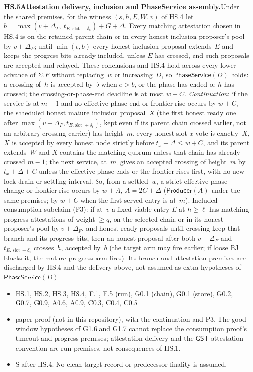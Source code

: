 \documentclass{article}
\newcommand{\slot}{\operatorname{slot}}
\newcommand{\dagnode}[6]{%
\par\medskip\noindent\textbf{#1\enspace #2.}\enspace #3
\begin{itemize}[leftmargin=2.2em,itemsep=0pt,topsep=2pt]
\item[\emph{Uses}] #4
\item[\emph{Evid.}] #5
\item[\emph{Task}] #6
\end{itemize}}
\begin{document}
\dagnode{HS.5}{Attestation delivery, inclusion and PhaseService assembly}{Under the shared
premises, for the witness $(s,h,E,W,v)$ of HS.4 let
$b=\max(v+\Delta_F,\ t_{E.\slot+\delta_{\mathrm t}})+G+\Delta$.  Every matching
attestation chosen in HS.4 is on the retained parent chain or in every honest
inclusion proposer's pool by $v+\Delta_F$; until $\min(e,b)$ every honest
inclusion proposal extends~$E$ and keeps the progress bits already included,
unless $E$ has crossed, and such proposals are accepted and relayed.  These
conclusions and HS.4 hold across every lower advance of $\Sigma.F$ without
replacing~$w$ or increasing~$D$, so $\mathsf{PhaseService}(D)$
holds: a crossing of~$h$ is accepted by~$b$ when $e>b$, or the phase has
ended or $h$ has crossed; the crossing-or-phase-end deadline is at most
$w+C$.  \emph{Continuation}: if the service is at $m-1$ and no
effective phase end or frontier rise occurs by $w+C$, the scheduled honest
mature inclusion proposal~$X$ (the first honest ready one after
$\max(v+\Delta_F,t_{E.\slot+\delta_{\mathrm t}})$, kept even if its parent chain
crossed earlier, not an arbitrary crossing carrier) has height~$m$, every
honest slot-$x$ vote is exactly~$X$, $X$ is accepted by every honest node
strictly before $t_x+\Delta\leq w+C$, and its parent extends~$W$ and $X$
contains the matching quorum unless that chain has already crossed $m-1$; the
next service, at~$m$, gives an accepted crossing of height~$m$ by
$t_x+\Delta+C$ unless the effective phase ends or the frontier rises first, with
no new lock drain or settling interval.  So, from a settled~$w$, a strict
effective phase change or frontier rise occurs by $w+A$, $A=2C+\Delta$
($\mathsf{Producer}(A)$ under the same premises; by $w+C$ when the first
served entry is at~$m$).  Included consumption subclaim
(P3): if at~$v$ a fixed viable entry $E$ at $h\geq\ell$ has matching
progress attestations of weight $\geq q$, on the selected chain or in its honest
proposer's pool by $v+\Delta_F$, and honest ready proposals until crossing
keep that branch and its progress bits, then an honest proposal after both
$v+\Delta_F$ and $t_{E.\slot+\delta_{\mathrm t}}$ crosses~$h$, accepted by~$b$
(the target arm may fire earlier; if loose BJ blocks it, the mature progress
arm fires).  Its branch and attestation premises are discharged by HS.4 and the
delivery above, not assumed as extra hypotheses of $\mathsf{PhaseService}(D)$.}
{HS.1, HS.2, HS.3, HS.4, F.1, F.5 (run), G0.1 (chain), G0.1 (store), G0.2, G0.7,
G0.9, A0.6, A0.9, C0.3, C0.4, C0.5}{paper proof (not in this repository), with
the continuation and P3.  The good-window hypotheses of G1.6 and G1.7 cannot replace
the consumption proof's timeout and progress premises; attestation delivery and the
$\mathsf{GST}$ attestation convention are run premises, not consequences of HS.1.}{S
after HS.4.  No clean target record or predecessor finality is assumed.}
\end{document}
